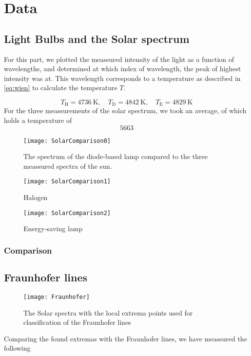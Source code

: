 \section{Data}

\subsection{Light Bulbs and the Solar spectrum}
For this part, we plotted the meassured intensity of the light as a function of 
wavelengths, and determined at which index of wavelength, the peak of highest
intensity was at. This wavelength corresponds to a temperature as described in
\cref{eq:wien} to calculate the temperature $T$.

\begin{equation}
    T_{\text{H}} = \SI{4736}{\kelvin}, \quad T_{\text{D}} =
    \SI{4842}{\kelvin}, \quad T_{\text{E}} = \SI{4829}{\kelvin}
\end{equation}
For the three meassurements of the solar spectrum, we took an average, of which
holds a temperature of
\begin{equation}
5663
\end{equation}

\begin{figure}[h!]
\centering
\texttt{[image: SolarComparison0]}
\caption{The spectrum of the diode-based lamp compared to the three meassured spectra of
the sun.} 
\label{diode}
\end{figure}

\begin{figure}[h!]
\centering
\texttt{[image: SolarComparison1]}
\caption{Halogen}
\label{halogen}
\end{figure}

\begin{figure}[h!]
\centering
\texttt{[image: SolarComparison2]}
\caption{Energy-saving lamp}
\label{Energy-saving}
\end{figure}

\subsubsection{Comparison}

\subsection{Fraunhofer lines}
\begin{figure}[h]
\centering
\texttt{[image: Fraunhofer]}
\caption{The Solar spectra with the local extrema points used for
classification of the Fraunhofer lines}
\label{frauenhofer}
\end{figure}

Comparing the found extremas with the Fraunhofer lines, we have meassured the
following

